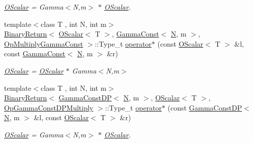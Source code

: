 \begin{DoxyCompactItemize}
\begin{DoxyCompactList}\small\item\em \mbox{\hyperlink{classENSEM_1_1OScalar}{O\+Scalar}} = Gamma$<$\+N,m$>$ $\ast$ \mbox{\hyperlink{classENSEM_1_1OScalar}{O\+Scalar}}. \end{DoxyCompactList}\item 
{\footnotesize template$<$class T , int N, int m$>$ }\\\mbox{\hyperlink{structENSEM_1_1BinaryReturn}{Binary\+Return}}$<$ \mbox{\hyperlink{classENSEM_1_1OScalar}{O\+Scalar}}$<$ T $>$, \mbox{\hyperlink{classENSEM_1_1GammaConst}{Gamma\+Const}}$<$ \mbox{\hyperlink{operator__name__util_8cc_a7722c8ecbb62d99aee7ce68b1752f337}{N}}, m $>$, \mbox{\hyperlink{structENSEM_1_1OpMultiplyGammaConst}{Op\+Multiply\+Gamma\+Const}} $>$\+::Type\+\_\+t \mbox{\hyperlink{group__obsscalar_ga1a9ed6642b9c94843e7a8c143c2f0236}{operator$\ast$}} (const \mbox{\hyperlink{classENSEM_1_1OScalar}{O\+Scalar}}$<$ T $>$ \&l, const \mbox{\hyperlink{classENSEM_1_1GammaConst}{Gamma\+Const}}$<$ \mbox{\hyperlink{operator__name__util_8cc_a7722c8ecbb62d99aee7ce68b1752f337}{N}}, m $>$ \&r)
\begin{DoxyCompactList}\small\item\em \mbox{\hyperlink{classENSEM_1_1OScalar}{O\+Scalar}} = \mbox{\hyperlink{classENSEM_1_1OScalar}{O\+Scalar}} $\ast$ Gamma$<$\+N,m$>$ \end{DoxyCompactList}\item 
{\footnotesize template$<$class T , int N, int m$>$ }\\\mbox{\hyperlink{structENSEM_1_1BinaryReturn}{Binary\+Return}}$<$ \mbox{\hyperlink{classENSEM_1_1GammaConstDP}{Gamma\+Const\+DP}}$<$ \mbox{\hyperlink{operator__name__util_8cc_a7722c8ecbb62d99aee7ce68b1752f337}{N}}, m $>$, \mbox{\hyperlink{classENSEM_1_1OScalar}{O\+Scalar}}$<$ T $>$, \mbox{\hyperlink{structENSEM_1_1OpGammaConstDPMultiply}{Op\+Gamma\+Const\+D\+P\+Multiply}} $>$\+::Type\+\_\+t \mbox{\hyperlink{group__obsscalar_gadcaef62da25fe9015ccfbdc330caee50}{operator$\ast$}} (const \mbox{\hyperlink{classENSEM_1_1GammaConstDP}{Gamma\+Const\+DP}}$<$ \mbox{\hyperlink{operator__name__util_8cc_a7722c8ecbb62d99aee7ce68b1752f337}{N}}, m $>$ \&l, const \mbox{\hyperlink{classENSEM_1_1OScalar}{O\+Scalar}}$<$ T $>$ \&r)
\begin{DoxyCompactList}\small\item\em \mbox{\hyperlink{classENSEM_1_1OScalar}{O\+Scalar}} = Gamma$<$\+N,m$>$ $\ast$ \mbox{\hyperlink{classENSEM_1_1OScalar}{O\+Scalar}}. \end{DoxyCompactList}\item 

\end{DoxyCompactItemize}
